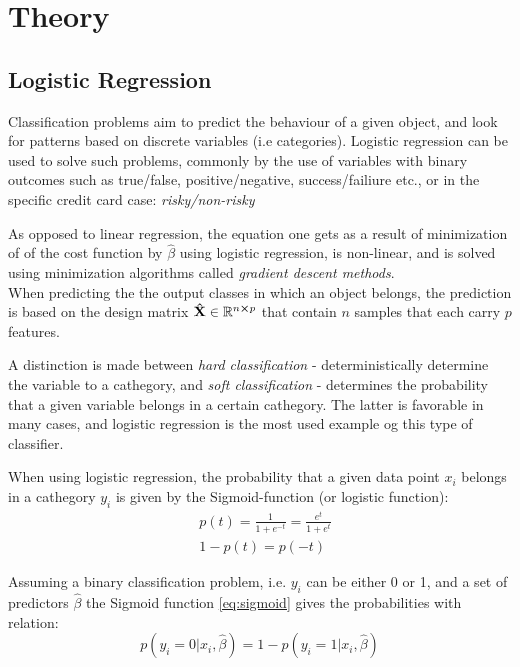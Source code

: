 \section{Theory}
\label{sec:theory}

\subsection{Logistic Regression}
Classification problems aim to predict the behaviour of a given object, and look for patterns based on discrete variables (i.e categories). Logistic regression can be used to solve such problems, commonly by the use of variables with binary outcomes such as true/false, positive/negative, success/failiure etc., or in the specific credit card case: \textit{risky/non-risky}

As opposed to linear regression, the equation one gets as a result of minimization of of the cost function by $\hat{\beta}$ using logistic regression, is non-linear, and is solved using minimization algorithms called \emph{gradient descent methods}. \\

When predicting the the output classes in which an object belongs, the prediction is based on the design matrix $\mathbf{\hat{X}} \in \mathbb{R}^{n\cross p}$ that contain $n$ samples that each carry $p$ features.

A distinction is made between \textit{hard classification} - deterministically determine the variable to a cathegory, and \textit{soft classification} - determines the probability that a given variable belongs in a certain cathegory. The latter is favorable in many cases, and logistic regression is the most used example og this type of classifier.

When using logistic regression, the probability that a given data point $x_i$ belongs in a cathegory $y_i$ is given by the Sigmoid-function (or logistic function):
\begin{equation}
\begin{split}
    & p(t) = \frac{1}{1 + e^{-t}} = \frac{e^t}{1+e^t} \\
    & 1-p(t) = p(-t)
\end{split}
  \label{eq:sigmoid}
\end{equation}

Assuming a binary classification problem, i.e. $y_i$ can be either 0 or 1, and a set of predictors $\hat{\beta}$ the Sigmoid function \eqref{eq:sigmoid} gives the probabilities with relation:
\begin{equation*}
  p(y_i = 0|x_i,\hat{\beta})  = 1 - p(y_i = 1|x_i,\hat{\beta})
  \label{eq:prob_relation}
\end{equation*}

